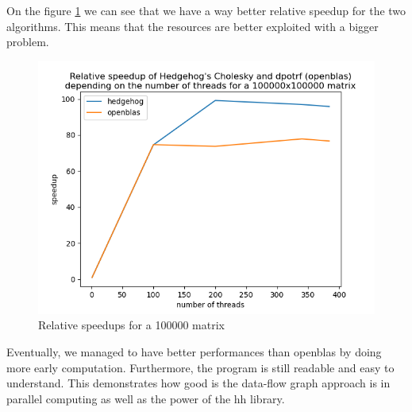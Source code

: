 On the figure \ref{fig:relativespeedup100000} we can see that we have a way
better relative speedup for the two algorithms. This means that the resources
are better exploited with a bigger problem.

\begin{figure}[!ht]
  \begin{center}
    \includegraphics[scale=0.8]{img/cho-img/relative-speedup-100000.png}
    \caption{Relative speedups for a 100000 matrix}
    \label{fig:relativespeedup100000}
  \end{center}
\end{figure}

Eventually, we managed to have better performances than openblas by doing more
early computation. Furthermore, the program is still readable and easy to
understand. This demonstrates how good is the data-flow graph approach is in
parallel computing as well as the power of the \gls{hh} library.
